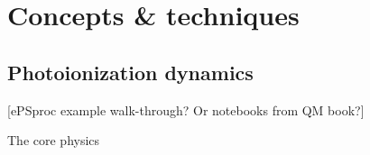 \section{Concepts \& techniques}

\subsection{Photoionization dynamics} 
[ePSproc example walk-through? Or notebooks from QM book?]

The core physics